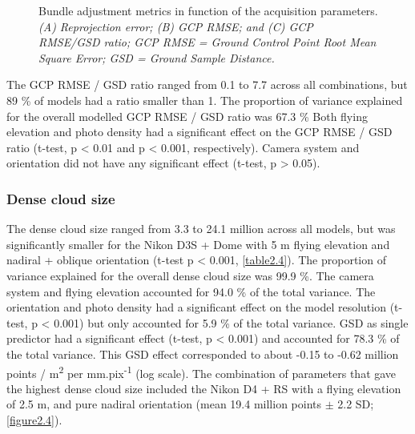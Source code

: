 \begin{figure}[ht]
	\caption[Bundle adjustment metrics in function of the acquisition parameters.]{Bundle adjustment metrics in function of the acquisition parameters. \textit{(A) Reprojection error; (B) GCP RMSE; and (C) GCP RMSE/GSD ratio; GCP RMSE = Ground Control Point Root Mean Square Error; GSD = Ground Sample Distance.}}
	\label{figure2.3}
    
\end{figure}

The GCP RMSE / GSD ratio ranged from 0.1 to 7.7 across all combinations, but 89 \% of models had a ratio smaller than 1. The proportion of variance explained for the overall modelled GCP RMSE / GSD ratio was 67.3 \% Both flying elevation and photo density had a significant effect on the GCP RMSE / GSD ratio (t-test, p < 0.01 and p < 0.001, respectively). Camera system and orientation did not have any significant effect (t-test, p > 0.05).
\subsubsection{Dense cloud size}\label{chapitre2_3.1.2}
The dense cloud size ranged from 3.3 to 24.1 million across all models, but was significantly smaller for the Nikon D3S + Dome with 5 m flying elevation and nadiral + oblique orientation (t-test p < 0.001, \autoref{table2.4}). The proportion of variance explained for the overall dense cloud size was 99.9 \%. The camera system and flying elevation accounted for 94.0 \% of the total variance. The orientation and photo density had a significant effect on the model resolution (t-test, p < 0.001) but only accounted for 5.9 \% of the total variance. GSD as single predictor had a significant effect (t-test, p < 0.001) and accounted for 78.3 \% of the total variance. This GSD effect corresponded to about -0.15 to -0.62 million points / m\textsuperscript{2} per mm.pix\textsuperscript{-1} (log scale). The combination of parameters that gave the highest dense cloud size included the Nikon D4 + RS with a flying elevation of 2.5 m, and pure nadiral orientation (mean 19.4 million points $\pm$ 2.2 SD; \autoref{figure2.4}).

